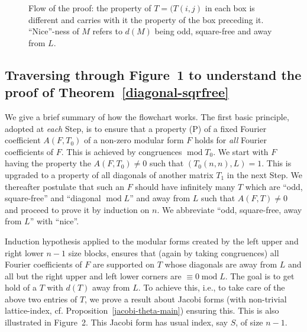 \documentclass[11pt]{amsart}
\numberwithin{equation}{section}
\renewcommand*{\mod}{\operatorname{mod}}
\begin{document}
\begin{figure}[!htbp]
\caption{ {\small Flow of the proof: the property of $T=(T(i,j)$ in each box is different and carries with it the property of the box preceding it. ``Nice''-ness of $M$ refers to $d(M)$ being odd, square-free and away from $L$.} }
\label{fig:flow}
\end{figure}







\subsection{Traversing through Figure~1 to understand the proof of Theorem~\ref{diagonal-sqrfree}} \label{traverse}

We give a brief summary of how the flowchart works. The first basic principle, adopted at {\it each} Step, is to ensure that a property (P) of a fixed Fourier coefficient $A(F,T_0)$ of a non-zero modular form $F$ holds for {\it all} Fourier coefficients of $F$. This is achieved by congruences $\mod T_0$. We  start with $F$ having  the property the $A(F,T_0)\neq 0$ such  that $(T_0(n,n),L)=1$. This is upgraded to a property of all diagonals of another matrix $T_1$ in the next  Step. We thereafter postulate that such an $F$ should have infinitely many $T$ which are ``odd, square-free'' and ``diagonal  $\mod L$'' and away from $L$ such that $A(F,T)\neq 0$ and proceed to prove it by induction on $n$. We abbreviate ``odd, square-free, away from $L$'' with ``nice''.

Induction hypothesis applied to the modular forms created by the left upper and right lower $n-1$ size blocks, ensures that (again by taking congruences) all Fourier coefficients of $F$ are supported on $T$ whose diagonals are away from $L$ and all but the right upper and left lower corners are $\equiv 0 \mod L$. The goal is to get hold of a $T$ with $d(T)$ away from $L$. To achieve this, i.e., to take care of the above two entries of $T$, we prove a result about Jacobi forms (with non-trivial lattice-index, cf. Proposition~\ref{jacobi-theta-main}) ensuring this. This is also illustrated in Figure~2. This Jacobi form has usual index, say $S$, of size $n-1$.
\end{document}
